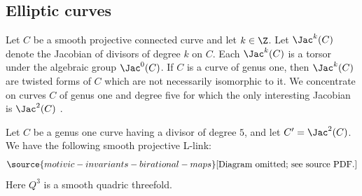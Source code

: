 \subsection{Elliptic curves}\label{ssec-dim3}


Let $C$ be a smooth projective
connected
curve and let $k \in \Z$.
Let $\Jac^k(C)$ denote
the Jacobian of divisors of degree $k$ on $C$.
Each $\Jac^k(C)$ is a torsor under
the algebraic group
$\Jac^0(C)$.
If $C$ is a curve of genus one,
then
$\Jac^k(C)$
are twisted forms of $C$
which are not necessarily isomorphic to it.
We concentrate on curves $C$
of genus one and degree five for which
the only interesting Jacobian is $\Jac^2(C)$ \cite{ShinderZhang}.

\begin{proposition}
\notready\label{prop:elliptic}
Let $C$ be a genus one curve
having
a divisor of degree $5$,
and let $C' = \Jac^2(C)$.
We have the following smooth projective L-link:
\begin{equation}\label{eq:L-link-curves}
\source{motivic-invariants-birational-maps}
 \text{[Diagram omitted; see source PDF.]}
\end{equation}
Here $Q^3$ is a smooth quadric threefold.
\end{proposition}
